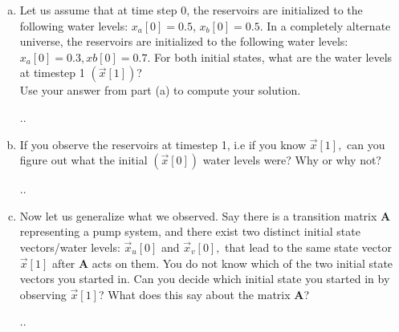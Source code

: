 \documentclass[11pt]{article}
\def\A{\textbf{A}} %
\begin{document}
\begin{enumerate}
\begin{enumerate}[(a)]
            \newpage
            
            \item Let us assume that at time step 0, the reservoirs are initialized to the following water levels: $x_a[0] = 0.5$, $x_b[0] = 0.5$. In a completely alternate universe, the reservoirs are initialized to the following water levels: $x_a[0] = 0.3, xb[0] = 0.7$. For both initial states, what are the water levels at timestep 1 $(\vec x[1])$?\\Use your answer from part (a) to compute your solution.
            \begin{Answer}
                ..
            \end{Answer}
            
            \newpage
            
            \item If you observe the reservoirs at timestep 1, i.e if you know $\vec x[1],$ can you figure out what the initial $(\vec x[0])$ water levels were? Why or why not?
            \begin{Answer}
                ..
            \end{Answer}
            
            \newpage
            
            \item Now let us generalize what we observed. Say there is a transition matrix $\A$ representing a pump system, and there exist two distinct initial state vectors/water levels: $\vec x_u[0]$ and $\vec x_v[0],$ that lead to the same state vector $\vec x[1]$ after $\A$ acts on them. You do not know which of the two initial state vectors you started in. Can you decide which initial state you started in by observing $\vec x[1]$? What does this say about the matrix $\A$?
            \begin{Answer}
                ..
            \end{Answer}
            
            \newpage
            

\end{enumerate}
\end{enumerate}
\end{document}
